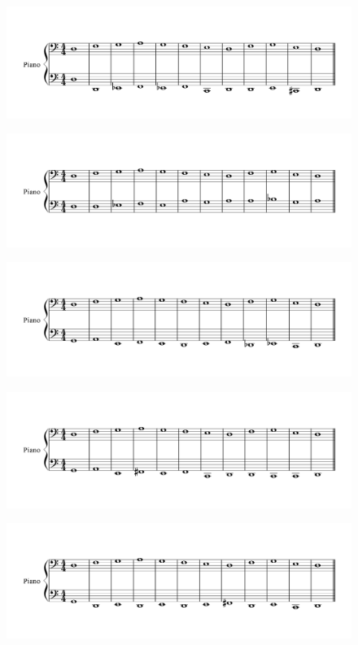 \begin{figure}[h!]
  \includegraphics[width=5in]{example-composition-images/5-1.png}
\end{figure}
\begin{figure}[h!]
  \includegraphics[width=5in]{example-composition-images/6-1.png}
\end{figure}
\begin{figure}[h!]
  \includegraphics[width=5in]{example-composition-images/7-1.png}
\end{figure}
\begin{figure}[h!]
  \includegraphics[width=5in]{example-composition-images/8-1.png}
\end{figure}
\begin{figure}[h!]
  \includegraphics[width=5in]{example-composition-images/9-1.png}
\end{figure}
